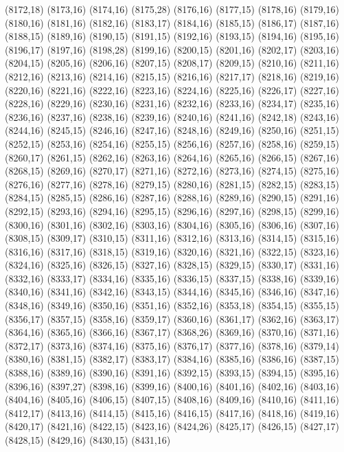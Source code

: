 (8172,18)
(8173,16)
(8174,16)
(8175,28)
(8176,16)
(8177,15)
(8178,16)
(8179,16)
(8180,16)
(8181,16)
(8182,16)
(8183,17)
(8184,16)
(8185,15)
(8186,17)
(8187,16)
(8188,15)
(8189,16)
(8190,15)
(8191,15)
(8192,16)
(8193,15)
(8194,16)
(8195,16)
(8196,17)
(8197,16)
(8198,28)
(8199,16)
(8200,15)
(8201,16)
(8202,17)
(8203,16)
(8204,15)
(8205,16)
(8206,16)
(8207,15)
(8208,17)
(8209,15)
(8210,16)
(8211,16)
(8212,16)
(8213,16)
(8214,16)
(8215,15)
(8216,16)
(8217,17)
(8218,16)
(8219,16)
(8220,16)
(8221,16)
(8222,16)
(8223,16)
(8224,16)
(8225,16)
(8226,17)
(8227,16)
(8228,16)
(8229,16)
(8230,16)
(8231,16)
(8232,16)
(8233,16)
(8234,17)
(8235,16)
(8236,16)
(8237,16)
(8238,16)
(8239,16)
(8240,16)
(8241,16)
(8242,18)
(8243,16)
(8244,16)
(8245,15)
(8246,16)
(8247,16)
(8248,16)
(8249,16)
(8250,16)
(8251,15)
(8252,15)
(8253,16)
(8254,16)
(8255,15)
(8256,16)
(8257,16)
(8258,16)
(8259,15)
(8260,17)
(8261,15)
(8262,16)
(8263,16)
(8264,16)
(8265,16)
(8266,15)
(8267,16)
(8268,15)
(8269,16)
(8270,17)
(8271,16)
(8272,16)
(8273,16)
(8274,15)
(8275,16)
(8276,16)
(8277,16)
(8278,16)
(8279,15)
(8280,16)
(8281,15)
(8282,15)
(8283,15)
(8284,15)
(8285,15)
(8286,16)
(8287,16)
(8288,16)
(8289,16)
(8290,15)
(8291,16)
(8292,15)
(8293,16)
(8294,16)
(8295,15)
(8296,16)
(8297,16)
(8298,15)
(8299,16)
(8300,16)
(8301,16)
(8302,16)
(8303,16)
(8304,16)
(8305,16)
(8306,16)
(8307,16)
(8308,15)
(8309,17)
(8310,15)
(8311,16)
(8312,16)
(8313,16)
(8314,15)
(8315,16)
(8316,16)
(8317,16)
(8318,15)
(8319,16)
(8320,16)
(8321,16)
(8322,15)
(8323,16)
(8324,16)
(8325,16)
(8326,15)
(8327,16)
(8328,15)
(8329,15)
(8330,17)
(8331,16)
(8332,16)
(8333,17)
(8334,16)
(8335,16)
(8336,15)
(8337,15)
(8338,16)
(8339,16)
(8340,16)
(8341,16)
(8342,16)
(8343,15)
(8344,16)
(8345,16)
(8346,16)
(8347,16)
(8348,16)
(8349,16)
(8350,16)
(8351,16)
(8352,16)
(8353,18)
(8354,15)
(8355,15)
(8356,17)
(8357,15)
(8358,16)
(8359,17)
(8360,16)
(8361,17)
(8362,16)
(8363,17)
(8364,16)
(8365,16)
(8366,16)
(8367,17)
(8368,26)
(8369,16)
(8370,16)
(8371,16)
(8372,17)
(8373,16)
(8374,16)
(8375,16)
(8376,17)
(8377,16)
(8378,16)
(8379,14)
(8380,16)
(8381,15)
(8382,17)
(8383,17)
(8384,16)
(8385,16)
(8386,16)
(8387,15)
(8388,16)
(8389,16)
(8390,16)
(8391,16)
(8392,15)
(8393,15)
(8394,15)
(8395,16)
(8396,16)
(8397,27)
(8398,16)
(8399,16)
(8400,16)
(8401,16)
(8402,16)
(8403,16)
(8404,16)
(8405,16)
(8406,15)
(8407,15)
(8408,16)
(8409,16)
(8410,16)
(8411,16)
(8412,17)
(8413,16)
(8414,15)
(8415,16)
(8416,15)
(8417,16)
(8418,16)
(8419,16)
(8420,17)
(8421,16)
(8422,15)
(8423,16)
(8424,26)
(8425,17)
(8426,15)
(8427,17)
(8428,15)
(8429,16)
(8430,15)
(8431,16)
